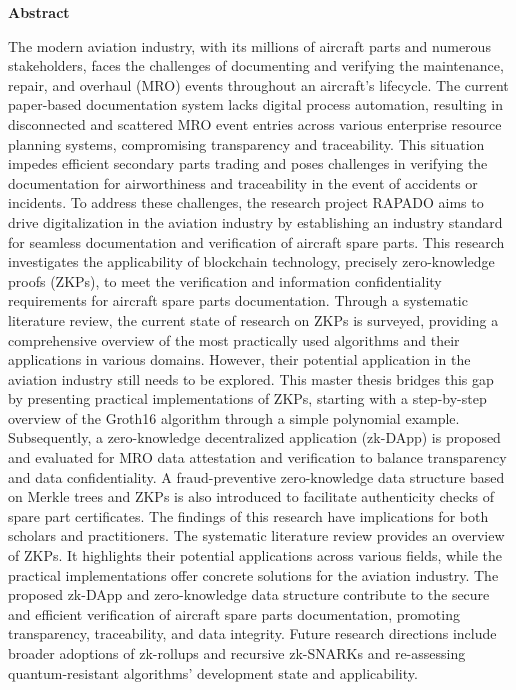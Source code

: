 \thispagestyle{empty}


\vspace*{1cm}

\begin{center}
    \textbf{Abstract}
\end{center}

\vspace*{1cm}
\noindent

The modern aviation industry, with its millions of aircraft parts and numerous stakeholders, faces the challenges of documenting and verifying the maintenance, repair, and overhaul (MRO) events throughout an aircraft's lifecycle. The current paper-based documentation system lacks digital process automation, resulting in disconnected and scattered MRO event entries across various enterprise resource planning systems, compromising transparency and traceability. This situation impedes efficient secondary parts trading and poses challenges in verifying the documentation for airworthiness and traceability in the event of accidents or incidents. To address these challenges, the research project RAPADO aims to drive digitalization in the aviation industry by establishing an industry standard for seamless documentation and verification of aircraft spare parts. This research investigates the applicability of blockchain technology, precisely zero-knowledge proofs (ZKPs), to meet the verification and information confidentiality requirements for aircraft spare parts documentation. Through a systematic literature review, the current state of research on ZKPs is surveyed, providing a comprehensive overview of the most practically used algorithms and their applications in various domains. However, their potential application in the aviation industry still needs to be explored. This master thesis bridges this gap by presenting practical implementations of ZKPs, starting with a step-by-step overview of the Groth16 algorithm through a simple polynomial example. Subsequently, a zero-knowledge decentralized application (zk-DApp) is proposed and evaluated for MRO data attestation and verification to balance transparency and data confidentiality. A fraud-preventive zero-knowledge data structure based on Merkle trees and ZKPs is also introduced to facilitate authenticity checks of spare part certificates. The findings of this research have implications for both scholars and practitioners. The systematic literature review provides an overview of ZKPs. It highlights their potential applications across various fields, while the practical implementations offer concrete solutions for the aviation industry. The proposed zk-DApp and zero-knowledge data structure contribute to the secure and efficient verification of aircraft spare parts documentation, promoting transparency, traceability, and data integrity. Future research directions include broader adoptions of zk-rollups and recursive zk-SNARKs and re-assessing quantum-resistant algorithms' development state and applicability.